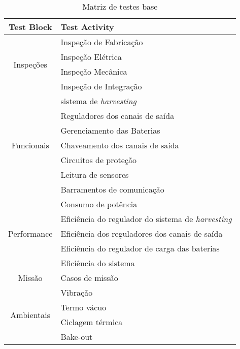 \begin{table}
    \ABNTEXfontereduzida
    \centering
    \caption{Matriz de testes base}
    \begin{tabular}{cl}
        \toprule
        \textbf{Test Block} & \textbf{Test Activity} \\
        \midrule
        \midrule
        \multirow{4}{*}{Inspeções}      & Inspeção de Fabricação                \\
                                        & Inspeção Elétrica                     \\
                                        & Inspeção Mecânica                     \\
                                        & Inspeção de Integração                \\
        \midrule
        \multirow{7}{*}{Funcionais}     & sistema de \textit{harvesting}        \\
                                        & Reguladores dos canais de saída       \\
                                        & Gerenciamento das Baterias    \\
                                        & Chaveamento dos canais de saída       \\
                                        & Circuitos de proteção                 \\
                                        & Leitura de sensores                   \\
                                        & Barramentos de comunicação            \\
        \midrule
        \multirow{5}{*}{Performance}    & Consumo de potência                   \\
                                        & Eficiência do regulador do sistema de \textit{harvesting} \\
                                        & Eficiência dos reguladores dos canais de saída \\
                                        & Eficiência do regulador de carga das baterias \\
                                        & Eficiência do sistema                 \\
        \midrule
        Missão                          & Casos de missão                       \\
        \midrule
        \multirow{4}{*}{Ambientais}     & Vibração                              \\
                                        & Termo vácuo                           \\
                                        & Ciclagem térmica                      \\
                                        & Bake-out                              \\
        \bottomrule
    \end{tabular}
    \label{tab:matriz-base}
\end{table}


